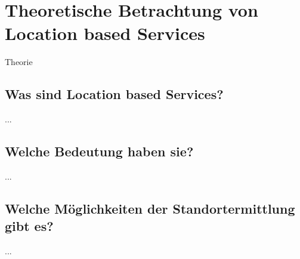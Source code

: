 \section{Theoretische Betrachtung von Location based Services}
Theorie
	\subsection{Was sind Location based Services?}
...
	\subsection{Welche Bedeutung haben sie?}
...
	\subsection{Welche Möglichkeiten der Standortermittlung gibt es?}
...